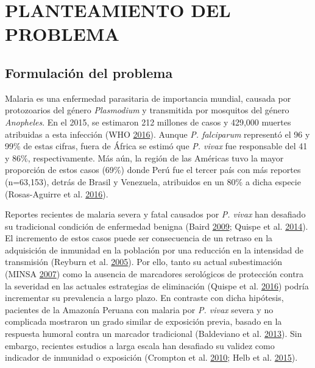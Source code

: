 \documentclass[
  a4paper]{article}
\begin{document}
\hypertarget{planteamiento-del-problema}{%
\section{PLANTEAMIENTO DEL PROBLEMA}\label{planteamiento-del-problema}}

\hypertarget{intro}{%
\subsection{Formulación del problema}\label{intro}}

Malaria es una enfermedad parasitaria de importancia mundial, causada
por protozoarios del género \emph{Plasmodium} y transmitida por
mosquitos del género \emph{Anopheles}. En el 2015, se estimaron 212
millones de casos y 429,000 muertes atribuidas a esta infección (WHO
\protect\hyperlink{ref-WHO2016world}{2016}). Aunque \emph{P. falciparum}
representó el 96 y 99\% de estas cifras, fuera de África se estimó que
\emph{P. vivax} fue responsable del 41 y 86\%, respectivamente. Más aún,
la región de las Américas tuvo la mayor proporción de estos casos (69\%)
donde Perú fue el tercer país con más reportes (n=63,153), detrás de
Brasil y Venezuela, atribuidos en un 80\% a dicha especie (Rosas-Aguirre
et al. \protect\hyperlink{ref-rosas2016peru}{2016}).

Reportes recientes de malaria severa y fatal causados por \emph{P.
vivax} han desafiado su tradicional condición de enfermedad benigna
(Baird \protect\hyperlink{ref-baird2009}{2009}; Quispe et al.
\protect\hyperlink{ref-quispe2014}{2014}). El incremento de estos casos
puede ser consecuencia de un retraso en la adquisición de inmunidad en
la población por una reducción en la intensidad de transmisión (Reyburn
et al. \protect\hyperlink{ref-reyburn2015}{2005}). Por ello, tanto su
actual subestimación (MINSA \protect\hyperlink{ref-norma2001}{2007})
como la ausencia de marcadores serológicos de protección contra la
severidad en las actuales estrategias de eliminación (Quispe et al.
\protect\hyperlink{ref-accelerate2016}{2016}) podría incrementar su
prevalencia a largo plazo. En contraste con dicha hipótesis, pacientes
de la Amazonía Peruana con malaria por \emph{P. vivax} severa y no
complicada mostraron un grado similar de exposición previa, basado en la
respuesta humoral contra un marcador tradicional (Baldeviano et al.
\protect\hyperlink{ref-baldevi2013}{2013}). Sin embargo, recientes
estudios a larga escala han desafiado su validez como indicador de
inmunidad o exposición (Crompton et al.
\protect\hyperlink{ref-crompton2010}{2010}; Helb et al.
\protect\hyperlink{ref-Helb2015exposure}{2015}).
\end{document}
